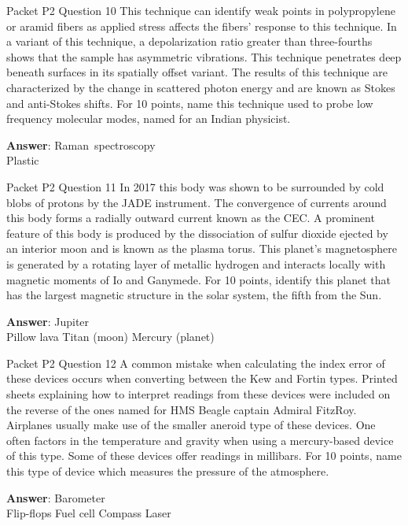 \begin{frame}{Packet P2 Question 10}
This technique can identify weak points in polypropylene or aramid fibers as applied stress affects the   fibers’ response to this technique. In a variant of this technique, a depolarization ratio greater than three-fourths shows that the sample has asymmetric vibrations. This technique penetrates deep beneath surfaces in its spatially offset variant. The results of this technique are characterized by the change in scattered photon energy and   are known as Stokes and anti-Stokes shifts.     For 10 points,   name this technique used to probe low frequency molecular modes, named for an Indian physicist.

\textbf{Answer}: Raman\ spectroscopy\\
 Plastic
\end{frame}

\begin{frame}{Packet P2 Question 11}
In 2017 this body was shown to be surrounded by cold blobs of   protons by the JADE instrument. The convergence of currents around this body forms a radially outward current known as the CEC. A prominent feature of this body is produced by the   dissociation of sulfur dioxide ejected by an interior moon and is known as the plasma torus. This planet’s magnetosphere is generated by a rotating layer of metallic hydrogen and interacts locally with magnetic moments of Io and Ganymede. For 10 points, identify this planet that has the largest magnetic structure in the solar system, the     fifth from the Sun.

\textbf{Answer}: Jupiter\\
 Pillow lava
 Titan (moon)
 Mercury (planet)
\end{frame}

\begin{frame}{Packet P2 Question 12}
A common mistake when calculating the index error of these devices occurs when converting between the Kew and Fortin types. Printed sheets explaining how to interpret readings from these devices were included on the reverse of the ones named for HMS Beagle captain Admiral FitzRoy. Airplanes usually make use of the smaller aneroid type of these devices. One often factors in the temperature and gravity when using a mercury-based device of this type. Some of these devices offer readings in millibars. For 10 points, name this type of device which measures the pressure of the atmosphere.        

\textbf{Answer}: Barometer\\
 Flip-flops
 Fuel cell
 Compass
 Laser
\end{frame}

